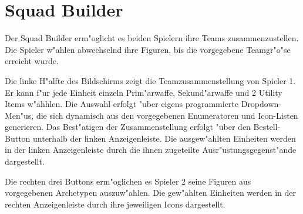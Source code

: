 \chapter{Squad Builder}

Der Squad Builder erm"oglicht es beiden Spielern ihre Teams zusammenzustellen. Die Spieler w"ahlen abwechselnd ihre Figuren, bis die vorgegebene Teamgr"o"se erreicht wurde. 

Die linke H"alfte des Bildschirms zeigt die Teamzusammenstellung von Spieler 1. Er kann f"ur jede Einheit einzeln Prim"arwaffe, Sekund"arwaffe und 2 Utility Items w"ahhlen. Die Auswahl erfolgt "uber eigens programmierte Dropdown-Men"us, die sich dynamisch aus den vorgegebenen Enumeratoren und Icon-Listen generieren. Das Best"atigen der Zusammenstellung erfolgt "uber den Bestell-Button unterhalb der linken Anzeigenleiste.   
Die ausgew"ahlten Einheiten werden in der linken Anzeigenleiste durch die ihnen zugeteilte Ausr"ustungsgegenst"ande dargestellt.  

Die rechten drei Buttons erm"oglichen es Spieler 2 seine Figuren aus vorgegebenen Archetypen auszuw"ahlen. Die gew"ahlten Einheiten werden in der rechten Anzeigenleiste durch ihre jeweiligen Icons dargestellt. 

